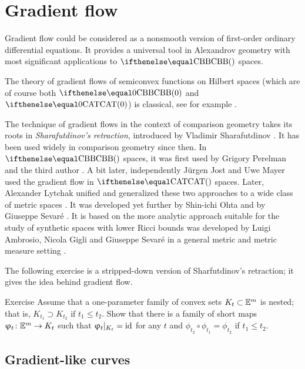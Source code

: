 \chapter{Gradient flow}\label{chap:grad}

Gradient flow could be considered as a nonsmooth version of first-order ordinary differential equations.
It provides a universal tool in Alexandrov geometry with most significant applications to $\Alex{}{}$ spaces. 

The theory of gradient flows of semiconvex functions on Hilbert spaces (which are of course both  $\Alex{0}{}$ and $\CAT{0}$)  is classical, see for example \cite{Brezis-book}.

 The technique of gradient flows in the context of comparison geometry takes its roots in \emph{Sharafutdinov's retraction}, 
introduced by Vladimir Sharafutdinov \cite{sharafutdinov}. 
It has been used  widely in comparison geometry
since then.
In $\Alex{}$ spaces, it was first used by Grigory Perelman and the third author \cite{perelman-petrunin:qg, petrunin:qg}.
A bit later, independently Jürgen Jost and Uwe Mayer \cite{jost,mayer} 
used the gradient flow in $\CAT{}$ spaces.
Later, Alexander Lytchak unified and generalized these two approaches
to a wide class of metric spaces \cite{lytchak:open-map}.
It was developed  yet further by Shin-ichi Ohta \cite{ohta} and by Giuseppe Sevar\'e \cite{sevare}.
It is based on the more  analytic approach suitable for the study of synthetic spaces with lower Ricci bounds was developed by Luigi Ambrosio, Nicola Gigli and  Giuseppe Sevar\'e in a general metric and metric measure setting 
\cite{ambrosio-gigli-savare}.

{\sloppy 
The following exercise is a stripped-down version of Sharfutdinov's retraction;
it gives the idea behind gradient flow.

}

\begin{thm}{Exercise}\label{ex:sharafutdinov}
Assume that a one-parameter family of convex sets $K_t\subset \EE^m$ is nested; 
that is, $K_{t_1}\supset K_{t_2}$ if $t_1\le t_2$.
Show that there is a family of short maps $\phi_t\:\EE^m\to K_t$ 
such that $\upvarphi_t|_{K_t}=\mathop{\rm id}\nolimits$ for any $t$ and $\phi_{t_2}\circ\phi_{t_1}=\phi_{t_2}$ if $t_1\le t_2$.
\end{thm}




\section{Gradient-like curves}\label{sec:gradient-like}


